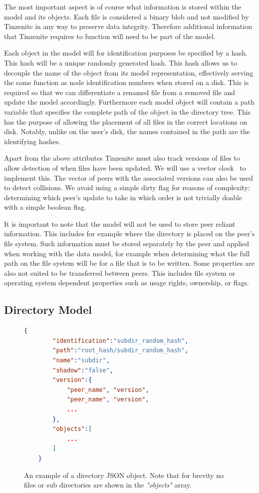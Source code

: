 The most important aspect is of course what information is stored within the model and its objects.
Each file is considered a binary blob and not modified by Tinzenite in any way to preserve data integrity.
Therefore additional information that Tinzenite requires to function will need to be part of the model.

Each object in the model will for identification purposes be specified by a hash.
This hash will be a unique randomly generated hash.
This hash allows us to decouple the name of the object from its model representation, effectively serving the same function as node identification numbers when stored on a disk.
This is required so that we can differentiate a renamed file from a removed file and update the model accordingly.
Furthermore each model object will contain a path variable that specifies the complete path of the object in the directory tree.
This has the purpose of allowing the placement of all files in the correct locations on disk.
Notably, unlike on the user's disk, the names contained in the path are the identifying hashes.

Apart from the above attributes Tinzenite must also track versions of files to allow detection of when files have been updated.
We will use a vector clock~\cite{mattern1989virtual} to implement this.
The vector of peers with the associated versions can also be used to detect collisions.
We avoid using a simple dirty flag for reasons of complexity: determining which peer's update to take in which order is not trivially doable with a simple boolean flag.

It is important to note that the model will not be used to store peer reliant information.
This includes for example where the directory is placed on the peer's file system.
Such information must be stored separately by the peer and applied when working with the data model, for example when determining what the full path on the file system will be for a file that is to be written.
Some properties are also not suited to be transferred between peers.
This includes file system or operating system dependent properties such as usage rights, ownership, or flags.

\subsection{Directory Model}
\label{sec:dir_model}

\begin{figure}[htp]
    \begin{lstlisting}[language=json,firstnumber=0]
    {
        "identification":"subdir_random_hash",
        "path":"root_hash/subdir_random_hash",
        "name":"subdir",
        "shadow":"false",
        "version":{
            "peer_name", "version",
            "peer_name", "version",
            ...
        },
        "objects":[
            ...
        ]
    }
    \end{lstlisting}
\caption[Directory JSON Model]{An example of a directory JSON object. Note that for brevity no files or sub directories are shown in the \textit{"objects"} array.}
\label{json:directory_model}
\end{figure}

